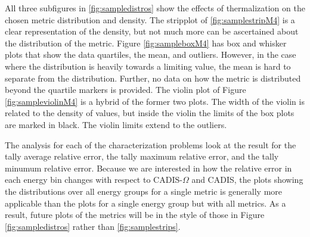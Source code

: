 All three subfigures in \ref{fig:sampledistros} show the effects of
thermalization on the chosen metric distribution and density. The stripplot of
\ref{fig:samplestripM4} is a clear representation of the density, but not much
more can be ascertained about the distribution of the metric. Figure
\ref{fig:sampleboxM4} has box and whisker plots that show the data quartiles,
the mean, and outliers. However, in the case where the distribution is heavily
towards a limiting value, the mean is hard to separate from the distribution.
Further, no data on how the metric is distributed beyond the quartile markers is
provided. The violin plot of Figure \ref{fig:sampleviolinM4} is a hybrid of the
former two plots. The width of the violin is related to the density of values,
but inside the violin the limits of the box plots are marked in black. The
violin limits extend to the outliers.

The analysis for each of the characterization problems look at the result for
the tally average relative error, the tally maximum relative error, and the
tally minumum relative error. Because we are interested in how the relative
error in each energy bin changes with respect to CADIS-$\Omega$ and CADIS, the
plots showing the distributions over all energy groups for a single metric
is generally more applicable than the plots for a single energy group
but with all metrics. As a result,
future plots of the metrics will be in the style of those
in Figure \ref{fig:sampledistros} rather than \ref{fig:samplestrips}.

